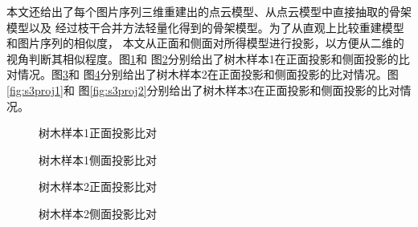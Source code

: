 本文还给出了每个图片序列三维重建出的点云模型、从点云模型中直接抽取的骨架模型以及
经过枝干合并方法轻量化得到的骨架模型。为了从直观上比较重建模型和图片序列的相似度，
本文从正面和侧面对所得模型进行投影，以方便从二维的视角判断其相似程度。图\ref{fig:s1proj1}和
图\ref{fig:s1proj2}分别给出了树木样本1在正面投影和侧面投影的比对情况。图\ref{fig:s2proj1}和
图\ref{fig:s2proj2}分别给出了树木样本2在正面投影和侧面投影的比对情况。图\ref{fig:s3proj1}和
图\ref{fig:s3proj2}分别给出了树木样本3在正面投影和侧面投影的比对情况。
\begin{figure}[H]
	\centering
	\hspace{3em}
	\hspace{3em}
	\hspace{3em}
	\hspace{3em}
	\caption{树木样本1正面投影比对}
	\label{fig:s1proj1}
\end{figure}
\begin{figure}
	\centering
	\hspace{3em}
	\hspace{3em}
	\hspace{3em}
	\hspace{3em}
	\caption{树木样本1侧面投影比对}
	\label{fig:s1proj2}
\end{figure}
\begin{figure}
	\centering
	\hspace{3em}
	\hspace{3em}
	\hspace{3em}
	\hspace{3em}
	\caption{树木样本2正面投影比对}
	\label{fig:s2proj1}
\end{figure}
\begin{figure}
	\centering
	\hspace{3em}
	\hspace{3em}
	\hspace{3em}
	\hspace{3em}
	\caption{树木样本2侧面投影比对}
	\label{fig:s2proj2}
\end{figure}
